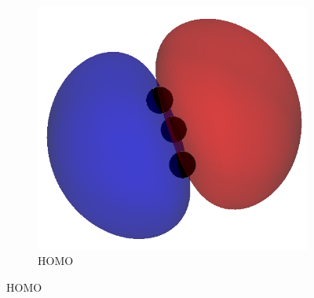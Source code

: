 \documentclass[12pt]{article}
\begin{document}
\begin{figure}[H]
\begin{subfigure}[b]{0.45\textwidth}
        \includegraphics[width=\textwidth]{figures/h2o_homo.png}
        \caption{ HOMO}
    \end{subfigure}

    \vspace{1em}


\end{figure}
\end{document}
